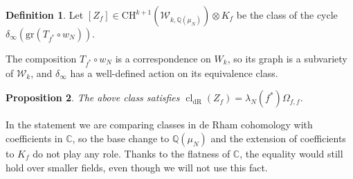 \documentclass[11pt, a4paper, reqno]{amsart}
\theoremstyle{definition}
\newtheorem{definition}{Definition}[subsection]
\theoremstyle{plain}
\newtheorem{proposition}[definition]{Proposition}
\theoremstyle{remark}
\DeclareMathOperator{\cl}{cl}
\DeclareMathOperator{\dR}{dR}
\newcommand{\numberset}{\mathbb}
\newcommand{\C}{\numberset{C}}
\newcommand{\Q}{\numberset{Q}}
\newcommand{\CH}{\mathrm{CH}}
\newcommand{\KS}{\mathscr{W}}
\begin{document}
\begin{definition}
    Let $[Z_f]\in\CH^{k+1}(\KS_{k,\Q(\mu_N)})\otimes K_f$ be the class of the cycle $\delta_{\infty}(\mathrm{gr}(T_{f^*}\circ w_N))$.
\end{definition}
The composition $T_{f^*}\circ w_N$ is a correspondence on $W_k$, so its graph is a subvariety of $\KS_k$, and $\delta_{\infty}$ has a well-defined action on its equivalence class.
\begin{proposition}
    \label{prop:image-cycle-dr}
 The above class satisfies $\cl_{\dR}(Z_f) = \lambda_N(f^*)\Omega_{f,f}$.
\end{proposition}
In the statement we are comparing classes in de Rham cohomology with coefficients in $\C$, so the base change to $\Q(\mu_N)$ and the extension of coefficients to $K_f$ do not play any role. Thanks to the flatness of $\C$, the equality would still hold over smaller fields, even though we will not use this fact.
\end{document}

